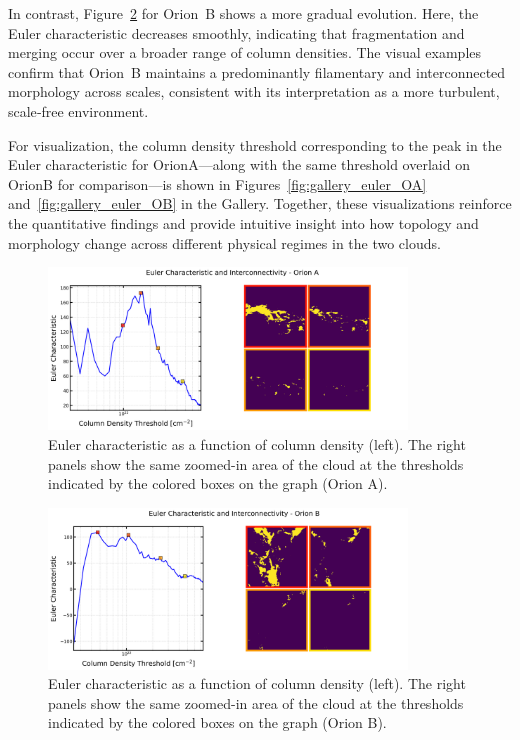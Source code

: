 In contrast, Figure~\ref{fig:Euler_Orion_B} for Orion~B shows a more gradual evolution.  
Here, the Euler characteristic decreases smoothly, indicating that fragmentation and merging occur over a broader range of column densities.  
The visual examples confirm that Orion~B maintains a predominantly filamentary and interconnected morphology across scales, consistent with its interpretation as a more turbulent, scale‑free environment.

For visualization, the column density threshold corresponding to the peak in the Euler characteristic for OrionA—along with the same threshold overlaid on OrionB for comparison—is shown in Figures~\ref{fig:gallery_euler_OA} and~\ref{fig:gallery_euler_OB} in the Gallery.
Together, these visualizations reinforce the quantitative findings and provide intuitive insight into how topology and morphology change across different physical regimes in the two clouds.

\begin{figure}[t]
    \centering
    \includegraphics[width=0.85\textwidth]{figures/euler_Orion_A.png}
    \caption{Euler characteristic as a function of column density (left). The right panels show the same zoomed-in area of the cloud at the thresholds indicated by the colored boxes on the graph (Orion A).}
    \label{fig:Euler_Orion_A}
\end{figure}

\begin{figure}[t]
    \centering
    \includegraphics[width=0.85\textwidth]{figures/euler_Orion_B.png}
    \caption{Euler characteristic as a function of column density (left). The right panels show the same zoomed-in area of the cloud at the thresholds indicated by the colored boxes on the graph (Orion B).}
    \label{fig:Euler_Orion_B}
\end{figure}

